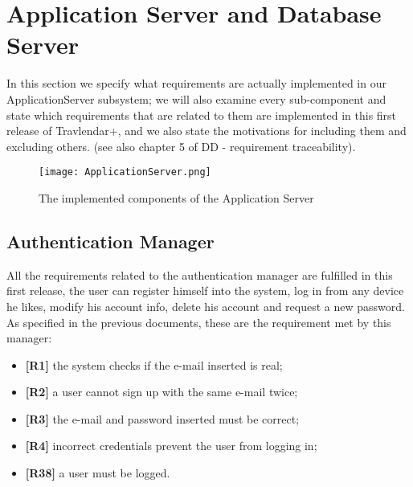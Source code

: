 \section{Application Server and Database Server}
\label{sec:ApplAndDBServers}
In this section we specify what requirements are actually implemented in our ApplicationServer subsystem; we will also examine every sub-component and state which requirements that are related to them are implemented in this first release of Travlendar+, and we also state the motivations for including them and excluding others. (see also chapter 5 of DD - requirement traceability).
\begin{figure}[H]
	\begin{center}
		\hspace*{-60pt}
		\texttt{[image: ApplicationServer.png]}
	\end{center}
\caption{The implemented components of the Application Server}
\end{figure}

\subsection{Authentication Manager}
All the requirements related to the authentication manager are fulfilled in this first release, the user can register himself into the system, log in from any device he likes, modify his account info, delete his account and request a new password. As specified in the previous documents, these are the requirement met by this manager:
\begin{itemize}
	\item \textbf{[R1]} the system checks if the e-mail inserted is real;
	\item \textbf{[R2]} a user cannot sign up with the same e-mail twice;
	\item \textbf{[R3]} the e-mail and password inserted must be correct;
	\item \textbf{[R4]} incorrect credentials prevent the user from logging in;
	\item \textbf{[R38]} a user must be logged.
\end{itemize}

